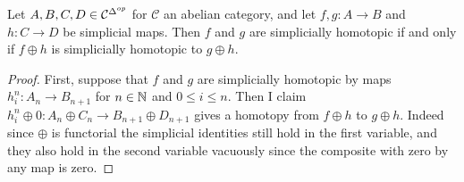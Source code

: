 \begin{lem}[label=lem:coprodPresSimpHomotop]
    Let $A,B,C,D \in \mathcal{C}^{\Delta^{op}}$ for $\mathcal{C}$ an abelian category, and let $f,g:A\to B$ and $h:C\to D$ be simplicial maps. Then $f$ and $g$ are simplicially homotopic if and only if $f\oplus h$ is simplicially homotopic to $g\oplus h$.
\end{lem}
\begin{proof}
    First, suppose that $f$ and $g$ are simplicially homotopic by maps $h_i^n:A_n\to B_{n+1}$ for $n \in \mathbb N$ and $0 \leq i \leq n$. Then I claim $h_i^n\oplus 0:A_n\oplus C_n\to B_{n+1}\oplus D_{n+1}$ gives a homotopy from $f\oplus h$ to $g\oplus h$. Indeed since $\oplus$ is functorial the simplicial identities still hold in the first variable, and they also hold in the second variable vacuously since the composite with zero by any map is zero.
    
    \vspace{10pt}


\end{proof}
